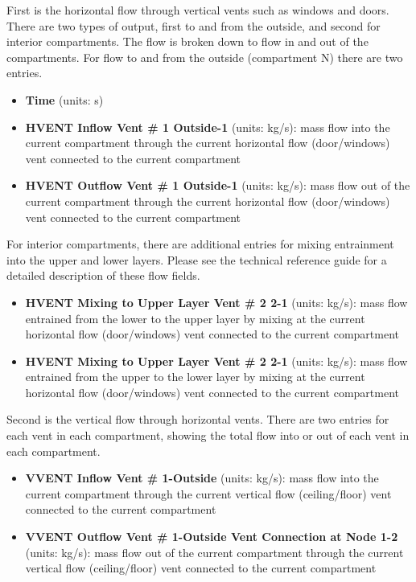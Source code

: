 First is the horizontal flow through vertical vents such as windows and doors. There are two types of output, first to and from the outside, and second for interior compartments. The flow is broken down to flow in and out of the compartments. For flow to and from the outside (compartment N) there are two entries.

\begin{itemize}
\item \textbf{Time} (units: s)
\item \textbf{HVENT Inflow Vent \# 1 Outside-1} (units: kg/s): mass flow into the current compartment through the current horizontal flow (door/windows) vent connected to the current compartment
\item \textbf{HVENT Outflow Vent \# 1 Outside-1} (units: kg/s): mass flow out of the current compartment through the current horizontal flow (door/windows) vent connected to the current compartment
\end{itemize}

 For interior compartments, there are additional entries for mixing entrainment into the upper and lower layers. Please see the technical reference guide for a detailed description of these flow fields.

\begin{itemize}
\item \textbf{HVENT Mixing to Upper Layer Vent \# 2 2-1} (units: kg/s): mass flow entrained from the lower to the upper layer by mixing at the current horizontal flow (door/windows) vent connected to the current compartment
\item \textbf{HVENT Mixing to Upper Layer Vent \# 2 2-1} (units: kg/s): mass flow entrained from the upper to the lower layer by mixing at the current horizontal flow (door/windows) vent connected to the current compartment
\end{itemize}

Second is the vertical flow through horizontal vents. There are two entries for each vent in each compartment, showing the total flow into or out of each vent in each compartment.

\begin{itemize}
\item \textbf{VVENT Inflow Vent \# 1-Outside} (units: kg/s):  mass flow into the current compartment through the current vertical flow (ceiling/floor) vent connected to the current compartment
\item \textbf{VVENT Outflow Vent \# 1-Outside Vent Connection at Node 1-2} (units: kg/s):  mass flow out of the current  compartment through the current vertical flow (ceiling/floor) vent connected to the current compartment
\end{itemize}


